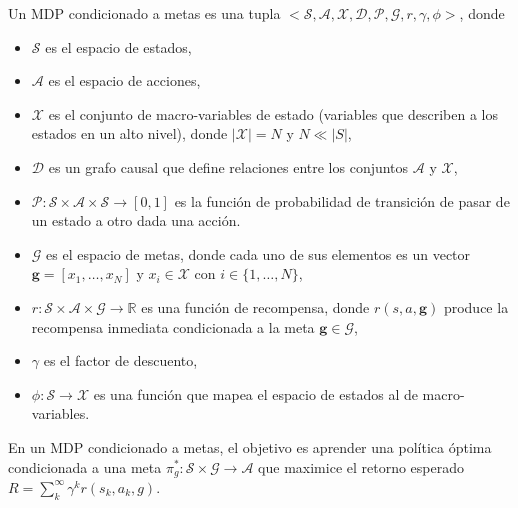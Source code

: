     Un MDP condicionado a metas es
una tupla $<\mathcal{S}, \mathcal{A}, \mathcal{X},
\mathcal{D}, \mathcal{P}, \mathcal{G}, r, \gamma, \phi>$, donde 
\begin{itemize}
    \item $\mathcal{S}$ es el espacio de estados, 
    \item $\mathcal{A}$ es el espacio de acciones, 
    \item $\mathcal{X}$ es el conjunto de
    macro-variables de estado \cite{chalupka2014visual} (variables 
    que describen a los estados en un alto nivel), donde $|\mathcal{X}| = N$ y
    $N \ll |S|$, 
    \item $\mathcal{D}$ es un grafo causal
    que define relaciones entre
    los conjuntos $\mathcal{A}$ y $\mathcal{X}$, 
    \item $\mathcal{P}: \mathcal{S} \times \mathcal{A} \times \mathcal{S} \rightarrow [0, 1]
     $ es la función de probabilidad de transición de pasar de un estado a otro dada una acción. 
    \item $\mathcal{G}$ es el espacio de metas, donde cada uno de sus elementos es un vector $\mathbf{g} = [x_1, \dots, x_N]$ y $x_i \in \mathcal{X}$
    con $i \in \{1, \dots, N\}$,
    \item $r : \mathcal{S} \times \mathcal{A} \times \mathcal{G} \rightarrow \mathbb{R}$ es una función
de recompensa, donde $r(s, a, \mathbf{g})$ produce la recompensa inmediata condicionada a la meta $\mathbf{g} \in \mathcal{G}$,
\item $\gamma$ es el factor de descuento,
\item $\phi : \mathcal{S} \rightarrow \mathcal{X}$ es una función que mapea el espacio de estados al de macro-variables.
\end{itemize}

En un MDP condicionado a metas, el objetivo es aprender una 
política óptima condicionada a una meta $\pi^*_g: \mathcal{S} \times \mathcal{G} \rightarrow \mathcal{A}$ que maximice el retorno esperado $R = \sum_{k}^{\infty}\gamma^{k} r(s_k, a_k, g)$.
